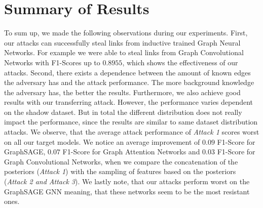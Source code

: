     \section{Summary of Results}
        To sum up, we made the following observations during our experiments.
        First, our attacks can successfully steal links from inductive trained Graph Neural Networks.
        For example we were able to steal links from Graph Convolutional Networks with F1-Scores up to $0.8955$, which shows the effectiveness of our attacks.
        Second, there exists a dependence between the amount of known edges the adversary has and the attack performance. 
        The more background knowledge the adversary has, the better the results.
        Furthermore, we also achieve good results with our transferring attack.
        However, the performance varies dependent on the shadow dataset.
        But in total the different distribution does not really impact the performance, since the results are similar to same dataset distribution attacks. 
        We observe, that the average attack performance of \emph{Attack 1} scores worst on all our target models.
        We notice an average improvement of $0.09$ F1-Score for GraphSAGE, $0.07$ F1-Score for Graph Attention Networks and $0.03$ F1-Score for Graph Convolutional Networks, when we compare the concatenation of the posteriors (\emph{Attack 1}) with the sampling of features based on the posteriors (\emph{Attack 2 and Attack 3}).
        We lastly note, that our attacks perform worst on the GraphSAGE GNN meaning, that these networks seem to be the most resistant ones.


